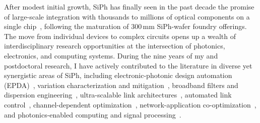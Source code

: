 After modest initial growth, SiPh has finally seen in the past decade the promise of large-scale integration with thousands to millions of optical components on a single chip~\cite{shekharRoadmappingNextGeneration2024}, following the maturation of 300\,mm SiPh-wafer foundry offerings. The move from individual devices to complex circuits opens up a wealth of interdisciplinary research opportunities at the intersection of photonics, electronics, and computing systems. During the nine years of my \myDegree{} and postdoctoral research, I have actively contributed to the literature in diverse yet synergistic areas of SiPh, including electronic-photonic design automation (EPDA)~\cite{wuCompactModelingCircuitlevel2017,zhangCompactModelingSilicon2017,jamesFlexibleProcessAwareCompact2022,jamesProcessVariationAwareCompact2023a}, variation characterization and mitigation~\cite{wuPairingMicroringbasedSilicon2018,wangEnergyefficientChannelAlignment2018,wangTamingEmergingDevices2019,wangBidirectionalTuningMicroringbased2019,wangCharacterizationApplicationsSpatial2020,wangEnergyEfficiencyYield2021}, broadband filters and dispersion engineering~\cite{wangDispersionEngineeredFabricationRobustSOI2023,wangIntegratedCompactTunable2023,parsonsOFC25}, ultra-scalable link architectures~\cite{wangScalableArchitectureSubpJ2023,novickHighbandwidthDensitySilicon2023}, automated link control~\cite{wangAutomatedTuningRingAssisted2024,wangInterleaverTuning,wangOFC25}, channel-dependent optimization~\cite{novickIntegratedPhotonicResonant2024,gopalEqualization2024}, network-application co-optimization~\cite{wangTaskMappingAssistedLaser2019,wangTrafficAdaptivePowerReconfiguration2021,michelogiannakisEfficientIntraRackResource2023,wuWavelengthReconfigurableTransceiver2024,wuFlexibleSiliconPhotonic2024}, and photonics-enabled computing and signal processing~\cite{naumanOFC25,zypmanDSP}.

